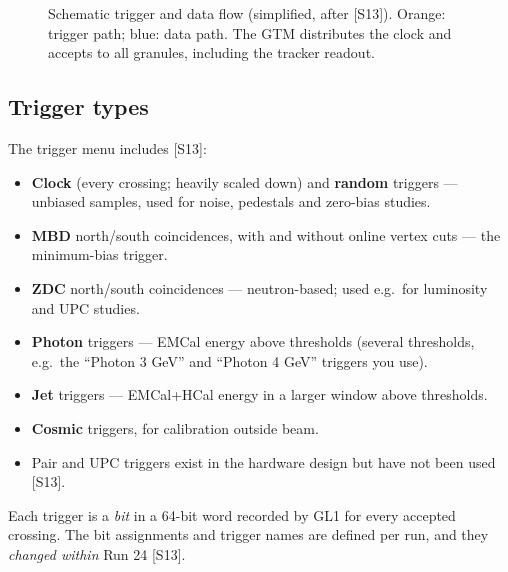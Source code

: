 \documentclass[11pt,letterpaper]{article}
\begin{document}
\begin{figure}[!htbp]\centering
{}
\caption{Schematic trigger and data flow (simplified, after [S13]). Orange: trigger path; blue: data path. The GTM distributes the clock and accepts to all granules, including the tracker readout.}\label{fig:flow}
\end{figure}

\subsection{Trigger types}
The trigger menu includes [S13]:
\begin{itemize}
\item \textbf{Clock} (every crossing; heavily scaled down) and \textbf{random} triggers --- unbiased samples, used for noise, pedestals and zero-bias studies.
\item \textbf{MBD} north/south coincidences, with and without online vertex cuts --- the minimum-bias trigger.
\item \textbf{ZDC} north/south coincidences --- neutron-based; used e.g.\ for luminosity and UPC studies.
\item \textbf{Photon} triggers --- EMCal energy above thresholds (several thresholds, e.g.\ the ``Photon 3 GeV'' and ``Photon 4 GeV'' triggers you use).
\item \textbf{Jet} triggers --- EMCal+HCal energy in a larger window above thresholds.
\item \textbf{Cosmic} triggers, for calibration outside beam.
\item Pair and UPC triggers exist in the hardware design but have not been used [S13].
\end{itemize}
Each trigger is a \emph{bit} in a 64-bit word recorded by GL1 for every accepted crossing.
The bit assignments and trigger names are defined per run, and they \emph{changed within} Run 24 [S13].
\end{document}
